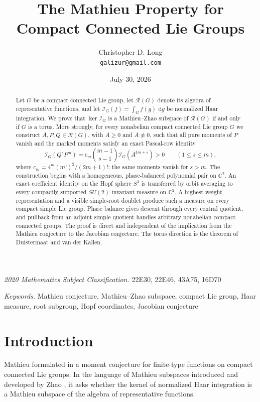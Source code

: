 \documentclass[11pt]{article}
\title{The Mathieu Property for Compact Connected Lie Groups}
\author{Christopher D. Long\\[2pt]
\small\texttt{galizur@gmail.com}}
\date{July 30, 2026}
\numberwithin{equation}{section}
\newcommand{\C}{\mathbb C}
\newcommand{\cR}{\mathcal R}
\newcommand{\cI}{\mathcal I}
\newcommand{\dd}{\,\mathrm d}
\newcommand{\mscclassification}{22E30, 22E46, 43A75, 16D70}
\newcommand{\paperkeywords}{Mathieu conjecture, Mathieu--Zhao subspace, compact Lie group,
Haar measure, root subgroup, Hopf coordinates, Jacobian conjecture}
\begin{document}
\maketitle

\begin{abstract}
Let $G$ be a compact connected Lie group, let $\cR(G)$ denote its algebra of
representative functions, and let $\cI_G(f)=\int_G f(g)\,\dd g$ be normalized
Haar integration.  We prove that $\ker \cI_G$ is a Mathieu--Zhao subspace of
$\cR(G)$ if and only if $G$ is a torus.  More strongly, for every nonabelian
compact connected Lie group $G$ we construct $A,P,Q\in\cR(G)$, with $A\geq0$
and $A\not\equiv0$, such that all pure moments of $P$ vanish and the marked
moments satisfy an exact Pascal-row identity
\[
 \cI_G(Q^sP^m)
 =c_m\binom{m-1}{s-1}\cI_G(A^{4m+s})>0
 \qquad(1\leq s\leq m),
\]
where $c_m=4^m(m!)^2/(2m+1)!$; the same moments vanish for $s>m$.
The construction begins with a homogeneous, phase-balanced polynomial pair on
$\C^2$.  An exact coefficient identity on the Hopf sphere $S^3$ is transferred
by orbit averaging to every compactly supported $SU(2)$-invariant measure on
$\C^2$.  A highest-weight representation and a visible simple-root doublet
produce such a measure on every compact simple Lie group.  Phase balance gives
descent through every central quotient, and pullback from an adjoint simple
quotient handles arbitrary nonabelian compact connected groups.  The proof is
direct and independent of the implication from the Mathieu conjecture to the
Jacobian conjecture.  The torus direction is the theorem of Duistermaat and
van der Kallen.
\end{abstract}

\begin{center}
\begin{minipage}{0.92\textwidth}
\small
\noindent\textit{2020 Mathematics Subject Classification.} \mscclassification

\smallskip
\noindent\textit{Keywords.} \paperkeywords
\end{minipage}
\end{center}

\section{Introduction}

Mathieu formulated in \cite{Mathieu1997} a moment conjecture for finite-type
functions on compact connected Lie groups.  In the language of Mathieu
subspaces introduced and developed by Zhao \cite{Zhao2012}, it asks whether
the kernel of normalized Haar integration is a Mathieu subspace of the
algebra of representative functions.
\end{document}
